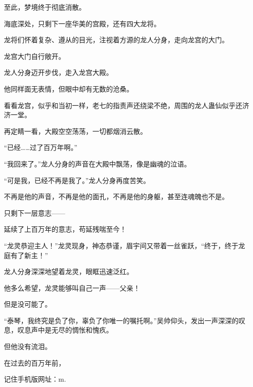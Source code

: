 \begin{this_body}
至此，梦境终于彻底消散。

海底深处，只剩下一座华美的宫殿，还有四大龙将。

龙将们怀着复杂、遵从的目光，注视着方源的龙人分身，走向龙宫的大门。

龙宫大门自行敞开。

龙人分身迈开步伐，走入龙宫大殿。

他同样面无表情，但眼中却有无数的沧桑。

看看龙宫，似乎和当初一样，老七的指责声还绕梁不绝，周围的龙人蛊仙似乎还济济一堂。

再定睛一看，大殿空空荡荡，一切都烟消云散。

“已经……过了百万年啊。”

“我回来了。”龙人分身的声音在大殿中飘荡，像是幽魂的泣语。

“可是我，已经不再是我了。”龙人分身再度苦笑。

不再是他的声音，不再是他的面孔，不再是他的身躯，甚至连魂魄也不是。

只剩下一层意志——

延续了上百万年的意志，苟延残喘至今！

“龙灵恭迎主人！”龙灵现身，神态恭谨，眉宇间又带着一丝雀跃，“终于，终于龙庭有了新主！”

龙人分身深深地望着龙灵，眼眶迅速泛红。

他多么希望，龙灵能够叫自己一声——父亲！

但是没可能了。

“泰琴，我终究是负了你，辜负了你唯一的嘱托啊。”吴帅仰头，发出一声深深的叹息，叹息声中是无尽的惆怅和愧疚。

但他没有流泪。

在过去的百万年前，

记住手机版网址：m.

\end{this_body}

